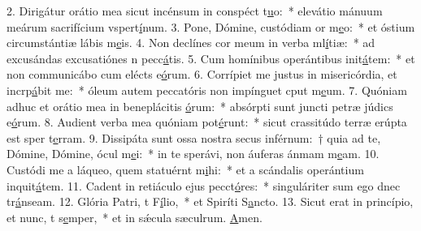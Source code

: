 2. Dirigátur orátio mea sicut incénsum in conspéct t\uline{u}o:~* elevátio mánuum meárum sacrifícium vspert\uline{í}num.
3. Pone, Dómine, custódiam or m\uline{e}o:~* et óstium circumstántiæ lábis m\uline{e}is.
4. Non declínes cor meum in verba ml\uline{í}tiæ:~* ad excusándas excusatiónes n pecc\uline{á}tis.
5. Cum homínibus operántibus init\uline{á}tem:~* et non communicábo cum elécts e\uline{ó}rum.
6. Corrípiet me justus in misericórdia, et incrp\uline{á}bit me:~* óleum autem peccatóris non impínguet cput m\uline{e}um.
7. Quóniam adhuc et orátio mea in beneplácitis \uline{ó}rum:~* absórpti sunt juncti petræ júdics e\uline{ó}rum.
8. Audient verba mea quóniam pot\uline{é}runt:~* sicut crassitúdo terræ erúpta est sper t\uline{e}rram.
9. Dissipáta sunt ossa nostra secus inférnum:~† quia ad te, Dómine, Dómine, ócul m\uline{e}i:~* in te sperávi, non áuferas ánmam m\uline{e}am.
10. Custódi me a láqueo, quem statuérnt m\uline{i}hi:~* et a scándalis operántium inquit\uline{á}tem.
11. Cadent in retiáculo ejus pecct\uline{ó}res:~* singuláriter sum ego dnec tr\uline{á}nseam.
12. Glória Patri, t F\uline{í}lio,~* et Spiríti S\uline{a}ncto.
13. Sicut erat in princípio, et nunc, t s\uline{e}mper,~* et in sǽcula sæculrum. \uline{A}men.
